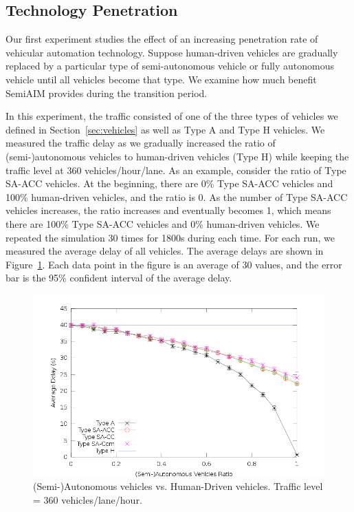 \subsection{Technology Penetration}

Our first experiment studies the effect of an increasing penetration rate
of vehicular automation technology.  Suppose human-driven vehicles are
gradually replaced by a particular type of semi-autonomous vehicle or
fully autonomous vehicle until all vehicles become that type.  We examine how
much benefit SemiAIM provides during the transition period.

In this experiment, the traffic consisted of one of the three types of
vehicles we defined in Section~\ref{sec:vehicles} as well as Type A
and Type H vehicles.  We measured the traffic delay as we gradually
increased the ratio of (semi-)autonomous vehicles to human-driven
vehicles (Type H) while keeping the traffic level at 360
vehicles/hour/lane.  As an example, consider the ratio of Type SA-ACC
vehicles.  At the beginning, there are 0\% Type SA-ACC vehicles and
100\% human-driven vehicles, and the ratio is 0.  As the number of
Type SA-ACC vehicles increases, the ratio increases and eventually
becomes 1, which means there are 100\% Type SA-ACC vehicles and 0\%
human-driven vehicles.  We repeated the simulation 30 times for 1800s
during each time.  For each run, we measured the average delay of all
vehicles.  The average delays are shown in Figure~\ref{fig:two360}.
Each data point in the figure is an average of 30 values, and the
error bar is the 95\% confident interval of the average delay.
 



\begin{figure}
\centering
\includegraphics[width=0.8\columnwidth]{figures/figure_1.png}
\caption{(Semi-)Autonomous vehicles vs. Human-Driven vehicles. Traffic
level = 360 vehicles/lane/hour.}
\label{fig:two360}
\vspace{-.3in}
\end{figure}

